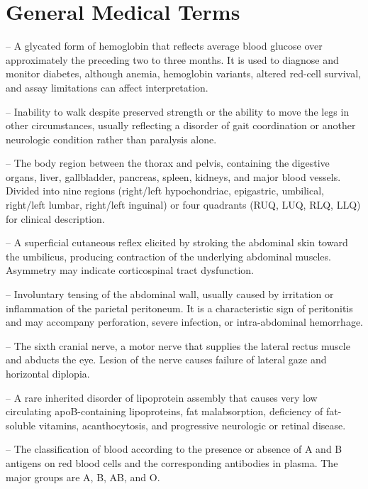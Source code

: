 \chapter{General Medical Terms}

-- A glycated form of hemoglobin that reflects average blood glucose over approximately the preceding two to three months. It is used to diagnose and monitor diabetes, although anemia, hemoglobin variants, altered red-cell survival, and assay limitations can affect interpretation.

-- Inability to walk despite preserved strength or the ability to move the legs in other circumstances, usually reflecting a disorder of gait coordination or another neurologic condition rather than paralysis alone.

-- The body region between the thorax and pelvis, containing the digestive organs, liver, gallbladder, pancreas, spleen, kidneys, and major blood vessels. Divided into nine regions (right/left hypochondriac, epigastric, umbilical, right/left lumbar, right/left inguinal) or four quadrants (RUQ, LUQ, RLQ, LLQ) for clinical description.

-- A superficial cutaneous reflex elicited by stroking the abdominal skin toward the umbilicus, producing contraction of the underlying abdominal muscles. Asymmetry may indicate corticospinal tract dysfunction.

-- Involuntary tensing of the abdominal wall, usually caused by irritation or inflammation of the parietal peritoneum. It is a characteristic sign of peritonitis and may accompany perforation, severe infection, or intra-abdominal hemorrhage.

-- The sixth cranial nerve, a motor nerve that supplies the lateral rectus muscle and abducts the eye. Lesion of the nerve causes failure of lateral gaze and horizontal diplopia.

-- A rare inherited disorder of lipoprotein assembly that causes very low circulating apoB-containing lipoproteins, fat malabsorption, deficiency of fat-soluble vitamins, acanthocytosis, and progressive neurologic or retinal disease.

-- The classification of blood according to the presence or absence of A and B antigens on red blood cells and the corresponding antibodies in plasma. The major groups are A, B, AB, and O.

